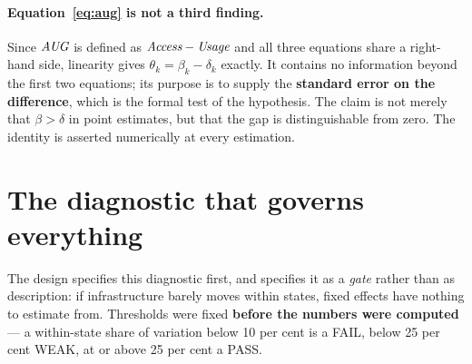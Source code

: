 \paragraph{Equation~\eqref{eq:aug} is not a third finding.} Since $\textit{AUG}{}$ is defined as
$\textit{Access}{} - \textit{Usage}{}$ and all three equations share a right-hand side, linearity gives
$\theta_k = \beta_k - \delta_k$ exactly. It contains no information beyond the first two equations;
its purpose is to supply the \textbf{standard error on the difference}, which is the formal test of
the hypothesis. The claim is not merely that $\beta > \delta$ in point estimates, but that the gap
is distinguishable from zero. The identity is asserted numerically at every estimation.

\section{The diagnostic that governs everything}
\label{sec:h1-gate}

The design specifies this diagnostic first, and specifies it as a \emph{gate} rather than as
description: if infrastructure barely moves within states, fixed effects have nothing to estimate
from. Thresholds were fixed \textbf{before the numbers were computed} --- a within-state share of
variation below 10 per cent is a FAIL, below 25 per cent WEAK, at or above 25 per cent a PASS.

